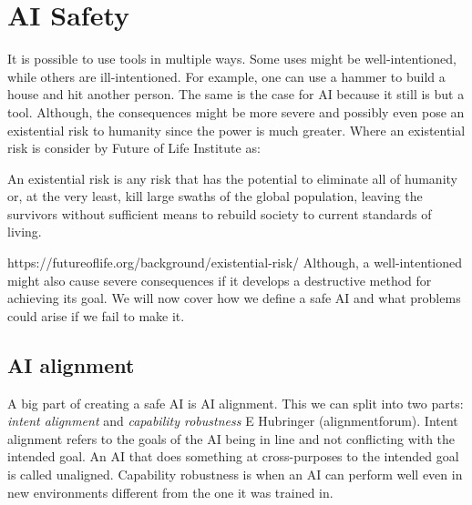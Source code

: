 \documentclass[12pt,A4]{report}
\newcommand{\autobaj}{}
\theoremstyle{definition}
\begin{document}
\section{AI Safety}
It is possible to use tools in multiple ways. Some uses might be well-intentioned, while others are ill-intentioned. For example, one can use a hammer to build a house and hit another person. The same is the case for AI because it still is but a tool. Although, the consequences might be more severe and possibly even pose an existential risk to humanity since the power is much greater. Where an existential risk is consider by \autobaj{Future of Life Institute} as:
\begin{displayquote}
An existential risk is any risk that has the potential to eliminate all of humanity or, at the very least, kill large swaths of the global population, leaving the survivors without sufficient means to rebuild society to current standards of living.
\end{displayquote}
https://futureoflife.org/background/existential-risk/
Although, a well-intentioned might also cause severe consequences if it develops a destructive method for achieving its goal. We will now cover how we define a safe AI and what problems could arise if we fail to make it.

\subsection{AI alignment}
A big part of creating a safe AI is AI alignment. This we can split into two parts: \textit{intent alignment} and \textit{capability robustness} \autobaj{E Hubringer (alignmentforum)}. Intent alignment refers to the goals of the AI being in line and not conflicting with the intended goal. An AI that does something at cross-purposes to the intended goal is called unaligned. Capability robustness is when an AI can perform well even in new environments different from the one it was trained in. 
\end{document}
